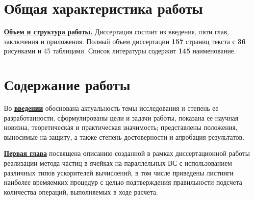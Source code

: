 
\section*{Общая характеристика работы}

\newcommand{\actuality}{\underline{\textbf{\actualityTXT}}}
\newcommand{\progress}{\underline{\textbf{\progressTXT}}}
\newcommand{\aim}{\underline{{\textbf\aimTXT}}}
\newcommand{\tasks}{\underline{\textbf{\tasksTXT}}}
\newcommand{\novelty}{\underline{\textbf{\noveltyTXT}}}
\newcommand{\influence}{\underline{\textbf{\influenceTXT}}}
\newcommand{\methods}{\underline{\textbf{\methodsTXT}}}
\newcommand{\defpositions}{\underline{\textbf{\defpositionsTXT}}}
\newcommand{\reliability}{\underline{\textbf{\reliabilityTXT}}}
\newcommand{\probation}{\underline{\textbf{\probationTXT}}}
\newcommand{\contribution}{\underline{\textbf{\contributionTXT}}}
\newcommand{\publications}{\underline{\textbf{\publicationsTXT}}}



\underline{\textbf{Объем и структура работы.}} Диссертация состоит из введения,
пяти глав, заключения и приложения. Полный объем диссертации
\textbf{157} страниц текста с \textbf{36} рисунками и 45 таблицами. Список литературы содержит \textbf{145} наименование.

\section*{Содержание работы}
Во \underline{\textbf{введении}} 
обоснована актуальность темы исследования и степень
ее разработанности, сформулированы цели и задачи работы, показана ее научная новизна, теоретическая и практическая значимость; представлены положения, выносимые на защиту, а также степень достоверности и апробация результатов.






\underline{\textbf{Первая глава}} посвящена описанию созданной в рамках диссертационной работы реализации метода частиц в ячейках на параллельных ВС с использованием различных типов ускорителей вычислений, в том числе приведены листинги наиболее времяемких процедур с целью подтверждения правильности подсчета количества операций, выполняемых в ходе расчета. 

